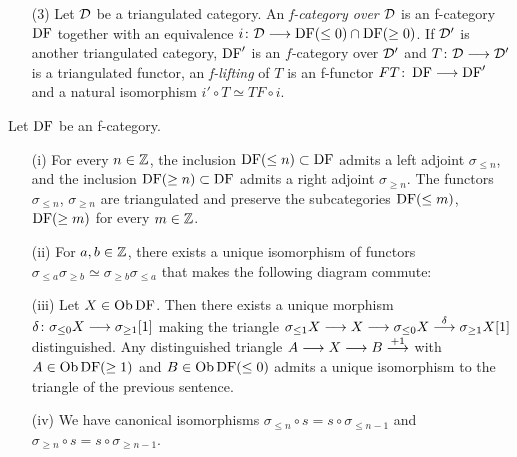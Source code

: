 \begin{definition}
\begin{itemize}
\item[(3)] 
Let $\mathcal{D}$ be a triangulated category. An \emph{f-category over $\mathcal{D}$} is an f-category $\operatorname{DF}$ together with an equivalence $i\colon \mathcal{D}\longrightarrow\operatorname{DF}(\leq 0)\cap\operatorname{DF}(\geq 0)$.
If $\mathcal{D}'$ is another triangulated category, $\operatorname{DF}'$ is an $f$-category over $\mathcal{D}'$ and $T\colon \mathcal{D}\longrightarrow\mathcal{D}'$ is a triangulated functor, an \emph{f-lifting} of $T$ is an f-functor
$FT\colon \operatorname{DF}\longrightarrow\operatorname{DF}'$ and a natural isomorphism $i'\circ T\simeq TF\circ i$.

\end{itemize}
\label{def_f_category}
\end{definition}


\begin{proposition}
Let $\operatorname{DF}$ be an f-category.
\begin{itemize}
\item[(i)] For every $n\in\mathbb{Z}$, the inclusion $\operatorname{DF}(\leq n)\subset\operatorname{DF}$ admits a left adjoint $\sigma_{\leq n}$, and the inclusion $\operatorname{DF}(\geq n)\subset\operatorname{DF}$ admits a right adjoint $\sigma_{\geq n}$.
The functors $\sigma_{\leq n}$, $\sigma_{\geq n}$ are triangulated and preserve the subcategories $\operatorname{DF}(\leq m)$, $\operatorname{DF}(\geq m)$ for every $m\in\mathbb{Z}$.
\item[(ii)] For $a,b\in\mathbb{Z}$, there exists a unique isomorphism of functors $\sigma_{\leq a}\sigma_{\geq b}\simeq\sigma_{\geq b}\sigma_{\leq a}$ that makes the following diagram commute:


\item[(iii)] Let $X\in\operatorname{\mathrm{Ob}}\operatorname{DF}$. Then there exists a unique morphism $\delta\colon \sigma_{\leq 0}X\longrightarrow\sigma_{\geq 1}[1]$ making the triangle $\sigma_{\leq 1}X\longrightarrow X\longrightarrow\sigma_{\leq 0}X\stackrel{\delta}{\longrightarrow}\sigma_{\geq 1}X[1]$
distinguished.
Any distinguished triangle $A\longrightarrow X\longrightarrow B\stackrel{+1}{\longrightarrow}$ with $A\in\operatorname{\mathrm{Ob}}\operatorname{DF}(\geq 1)$ and $B\in\operatorname{\mathrm{Ob}}\operatorname{DF}(\leq 0)$ admits a unique isomorphism to the triangle of the previous sentence.

\item[(iv)] We have canonical isomorphisms $\sigma_{\leq n}\circ s=s\circ\sigma_{\leq n-1}$ and $\sigma_{\geq n}\circ s=s\circ\sigma_{\geq n-1}$.

\end{itemize}

\label{prop_f_category1}
\end{proposition}

